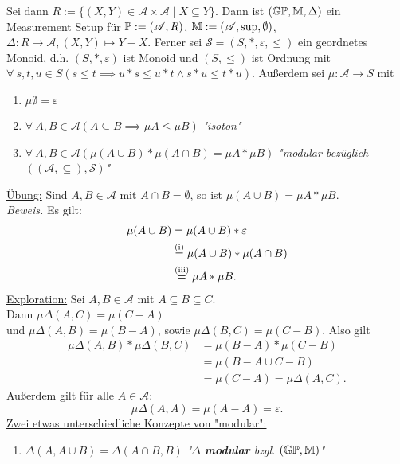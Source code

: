 \begin{beispiel}
    Sei dann $R := \{(X,Y) \in \mathscr{A}\times \mathscr{A} \mid X \subseteq Y\}$. Dann ist $(\G\P,\M,\Delta)$ ein Measurement Setup
    für $\P := (\mathscr{A},R)$, $\M:=(\mathscr{A}, \sup, \emptyset)$, $\Delta: R \to \mathscr{A}, (X,Y)\mapsto Y-X$.\nl
    Ferner sei $\mathscr{S} = (S, \ast, \varepsilon, \leq)$ ein geordnetes Monoid, d.h. $(S, \ast, \varepsilon)$ ist Monoid
    und $(S, \leq)$ ist Ordnung mit $\forall~s,t,u\in S(s\leq t\implies u \ast s\leq u\ast t \land s\ast u \leq t \ast u)$.
    Außerdem sei $\mu:\mathscr{A} \to S$ mit
    \begin{enumerate}[label=(\roman*)]
        \item $\mu \emptyset = \varepsilon$
        \item $\forall~ A,B \in \mathscr{A}(A\subseteq B \implies \mu A \leq \mu B)$ \textit{"isoton"}
        \item $\forall~A,B\in \mathscr{A}(\mu(A\cup B)\ast \mu(A\cap B)=\mu A \ast \mu B)$ \textit{"modular bezüglich $((\mathscr{A},\subseteq),\mathscr{S})$"}
    \end{enumerate}
    \underline{Übung:} Sind $A,B \in \mathscr{A}$ mit $A\cap B = \emptyset$, so ist $\mu(A \cup B) = \mu A \ast \mu B$.\\
    \textit{Beweis.} Es gilt: 
    \begin{align*}
        \mu(A\cup B) & = \mu(A\cup B) \ast \varepsilon\\
        & \stackeq{\text{(i)}}\mu(A\cup B)\ast\mu(A \cap B)\\
        & \stackeq{\text{(iii)}} \mu A \ast \mu B.
    \end{align*}
    \underline{Exploration:} Sei $A,B \in \mathscr{A}$ mit $A \subseteq B \subseteq C$.\\
    Dann $\mu\Delta(A,C)=\mu(C-A)$\\
    und $\mu\Delta(A,B) = \mu(B-A)$, sowie $\mu\Delta(B,C)=\mu(C-B)$.
    Also gilt 
    \begin{align*}
        \mu\Delta(A,B)\ast\mu\Delta(B,C) &= \mu(B-A) \ast \mu(C-B)\\
        & = \mu(B-A \cup C-B)\\
        & = \mu(C-A) = \mu\Delta(A,C).
    \end{align*}
    Außerdem gilt für alle $A \in \mathscr{A}$:
    $$ \mu\Delta(A,A) = \mu(A-A) = \varepsilon.$$
    \underline{Zwei etwas unterschiedliche Konzepte von "modular":}
    \begin{enumerate}
        \item $\Delta(A,A\cup B) = \Delta(A \cap B, B)$ \textit{"$\Delta$ \textbf{modular} bzgl. $(\G\P,\M)$"}

\end{enumerate}
\end{beispiel}
